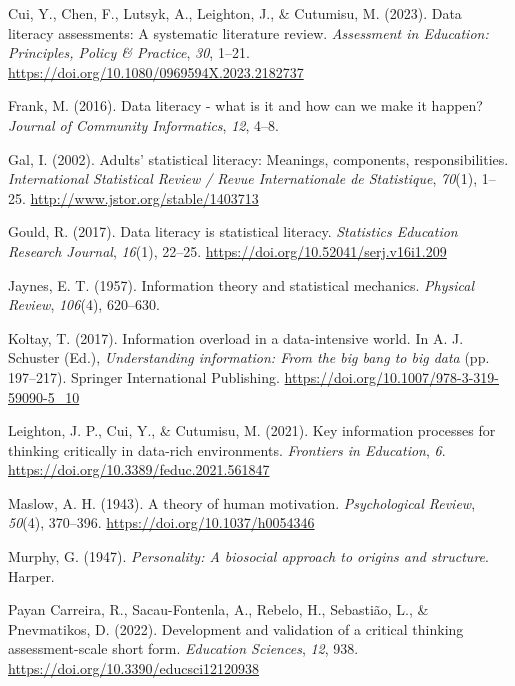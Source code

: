 \documentclass[
  12pt,
  a4paper,
  twoside]{article}
\newlength{\cslhangindent}
\newenvironment{CSLReferences}[2] %
 {\begin{list}{}{%
  \setlength{\itemindent}{0pt}
  \setlength{\leftmargin}{0pt}
  \setlength{\parsep}{0pt}
  \ifodd #1
   \setlength{\leftmargin}{\cslhangindent}
   \setlength{\itemindent}{-1\cslhangindent}
  \fi
  \setlength{\itemsep}{#2\baselineskip}}}
 {\end{list}}
\begin{document}
\begin{CSLReferences}{1}{0}
Cui, Y., Chen, F., Lutsyk, A., Leighton, J., \& Cutumisu, M. (2023).
Data literacy assessments: A systematic literature review.
\emph{Assessment in Education: Principles, Policy \& Practice},
\emph{30}, 1--21. \url{https://doi.org/10.1080/0969594X.2023.2182737}

Frank, M. (2016). Data literacy - what is it and how can we make it
happen? \emph{Journal of Community Informatics}, \emph{12}, 4--8.

Gal, I. (2002). Adults' statistical literacy: Meanings, components,
responsibilities. \emph{International Statistical Review / Revue
Internationale de Statistique}, \emph{70}(1), 1--25.
\url{http://www.jstor.org/stable/1403713}

Gould, R. (2017). Data literacy is statistical literacy.
\emph{Statistics Education Research Journal}, \emph{16}(1), 22--25.
\url{https://doi.org/10.52041/serj.v16i1.209}

Jaynes, E. T. (1957). Information theory and statistical mechanics.
\emph{Physical Review}, \emph{106}(4), 620--630.

Koltay, T. (2017). Information overload in a data-intensive world. In A.
J. Schuster (Ed.), \emph{Understanding information: From the big bang to
big data} (pp. 197--217). Springer International Publishing.
\url{https://doi.org/10.1007/978-3-319-59090-5_10}

Leighton, J. P., Cui, Y., \& Cutumisu, M. (2021). Key information
processes for thinking critically in data-rich environments.
\emph{Frontiers in Education}, \emph{6}.
\url{https://doi.org/10.3389/feduc.2021.561847}

Maslow, A. H. (1943). A theory of human motivation. \emph{Psychological
Review}, \emph{50}(4), 370--396. \url{https://doi.org/10.1037/h0054346}

Murphy, G. (1947). \emph{Personality: A biosocial approach to origins
and structure}. Harper.

Payan Carreira, R., Sacau-Fontenla, A., Rebelo, H., Sebastião, L., \&
Pnevmatikos, D. (2022). Development and validation of a critical
thinking assessment-scale short form. \emph{Education Sciences},
\emph{12}, 938. \url{https://doi.org/10.3390/educsci12120938}


\end{CSLReferences}
\end{document}
